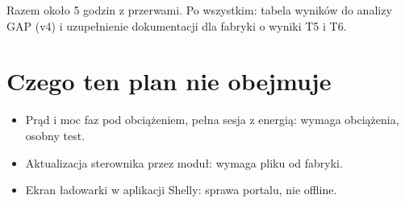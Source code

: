 \documentclass[11pt,a4paper]{article}
\begin{document}
Razem około 5 godzin z przerwami. Po wszystkim: tabela wyników do analizy GAP (v4) i uzupełnienie dokumentacji dla fabryki o wyniki T5 i T6.


\section{Czego ten plan nie obejmuje}

\begin{itemize}
\item Prąd i moc faz pod obciążeniem, pełna sesja z energią: wymaga obciążenia, osobny test.
\item Aktualizacja sterownika przez moduł: wymaga pliku od fabryki.
\item Ekran ładowarki w aplikacji Shelly: sprawa portalu, nie offline.
\end{itemize}
\end{document}
